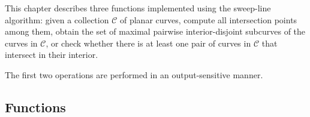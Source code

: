 

This chapter describes three functions implemented using the
sweep-line algorithm: given a collection ${\mathcal C}$ of 
planar curves, compute all intersection points among them,
obtain the set of maximal pairwise interior-disjoint subcurves
of the curves in ${\mathcal C}$, or check whether there is at
least one pair of curves in ${\mathcal C}$ that intersect in
their interior.

The first two operations are performed in an output-sensitive
manner.

\subsection*{Functions}

\\
\\
